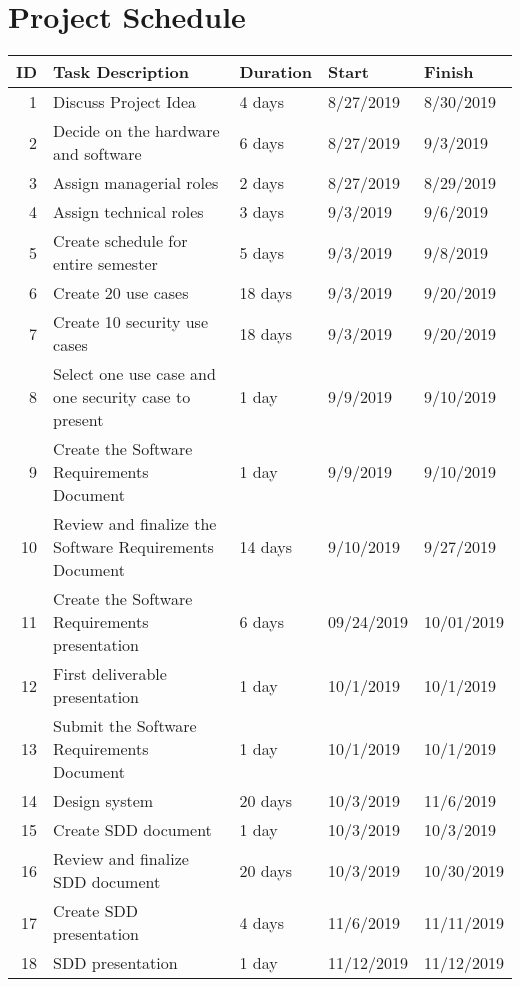\section{Project Schedule}

\begin{tabular}{| r | p{5cm} | l | l | l |}
    \hline
    ID & Task Description & Duration & Start & Finish \\ \hline
    1 & Discuss Project Idea & 4 days & 8/27/2019 & 8/30/2019 \\ \hline
    2 & Decide on the hardware and software & 6 days & 8/27/2019 & 9/3/2019 \\ \hline
    3 & Assign managerial roles & 2 days & 8/27/2019 & 8/29/2019 \\ \hline
    4 & Assign technical roles & 3 days & 9/3/2019 & 9/6/2019 \\ \hline
    5 & Create schedule for entire semester & 5 days & 9/3/2019 & 9/8/2019 \\ \hline
    6 & Create 20 use cases & 18 days & 9/3/2019 & 9/20/2019 \\ \hline
    7 & Create 10 security use cases & 18 days & 9/3/2019 & 9/20/2019 \\ \hline
    8 & Select one use case and one security case to present & 1 day & 9/9/2019 & 9/10/2019 \\ \hline
    9 & Create the Software Requirements Document & 1 day & 9/9/2019 & 9/10/2019 \\ \hline
    10 & Review and finalize the Software Requirements Document & 14 days & 9/10/2019 & 9/27/2019 \\ \hline
    11 & Create the Software Requirements presentation & 6 days & 09/24/2019 & 10/01/2019 \\ \hline
    12 & First deliverable presentation & 1 day & 10/1/2019 & 10/1/2019 \\ \hline
    13 & Submit the Software Requirements Document & 1 day & 10/1/2019 & 10/1/2019 \\ \hline
    14 & Design system & 20 days & 10/3/2019 & 11/6/2019 \\ \hline
    15 & Create SDD document & 1 day & 10/3/2019 & 10/3/2019 \\ \hline
    16 & Review and finalize SDD document & 20 days & 10/3/2019 & 10/30/2019 \\ \hline
    17 & Create SDD presentation & 4 days & 11/6/2019 & 11/11/2019 \\ \hline
    18 & SDD presentation & 1 day & 11/12/2019 & 11/12/2019 \\ \hline

\end{tabular}
